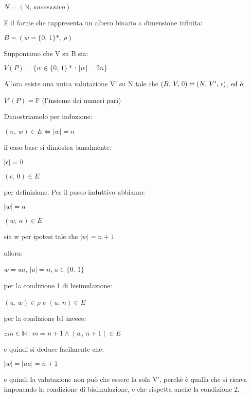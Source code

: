 $N=(\mathbb{N},\, successivo)$

E il farme che rappresenta un albero binario a dimensione infinita:

$B=(w=\{0,\,1\}*,\,\rho)$

Supponiamo che V su B sia: 

$V(P)=\{w\in\{0,\,1\}*\,:\,|w|=2n\}$

Allora esiste una unica valutazione V' su N tale che $(B,\, V,\,0)\leftrightarroweq(N,\, V',\,\epsilon)$,
ed è:

$V'(P)=\mathbb{P}$ (l'insieme dei numeri pari)

Dimostriamolo per induzione:

$(n,\, w)\in E\iff|w|=n$

il caso base si dimostra banalmente:

$|\epsilon|=0$

$(\epsilon,\,0)\in E$

per definizione. Per il passo induttivo abbiamo:

$|w|=n$

$(w,\, n)\in E$

sia w per ipotesi tale che $|w|=n+1$

allora:

$w=ua$, $|u|=n$, $a\in\{0,\,1\}$

per la condizione 1 di bisimulazione:

$(u,\, w)\in\rho$ e $(u,\, n)\in E$

per la condizione b1 invece:

$\exists m\in\mathbb{N}\,:\, m=n+1\wedge(w,\, n+1)\in E$

e quindi si deduce facilmente che:

$|w|=|ua|=n+1$

e quindi la valutazione non può che essere la sola V', perchè è qualla
che si ricava imponendo la condizione di bisimulazione, e che rispetta
anche la condizione 2.

